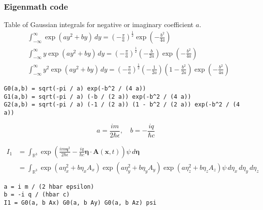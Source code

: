 \subsubsection*{Eigenmath code}

Table of Gaussian integrals for negative or imaginary coefficient $a$.
\begin{align*}
&\int_{-\infty}^\infty\exp(ay^2+by)\,dy
=\left(-\frac{\pi}{a}\right)^\frac{1}{2}
\exp\left(-\frac{b^2}{4a}\right)
\\
&\int_{-\infty}^\infty y\exp(ay^2+by)\,dy
=\left(-\frac{\pi}{a}\right)^\frac{1}{2}
\left(-\frac{b}{2a}\right)
\exp\left(-\frac{b^2}{4a}\right)
\\
&\int_{-\infty}^\infty y^2\exp(ay^2+by)\,dy
=\left(-\frac{\pi}{a}\right)^\frac{1}{2}
\left(-\frac{1}{2a}\right)
\left(1-\frac{b^2}{2a}\right)
\exp\left(-\frac{b^2}{4a}\right)
\end{align*}

{\footnotesize\begin{verbatim}
G0(a,b) = sqrt(-pi / a) exp(-b^2 / (4 a))
G1(a,b) = sqrt(-pi / a) (-b / (2 a)) exp(-b^2 / (4 a))
G2(a,b) = sqrt(-pi / a) (-1 / (2 a)) (1 - b^2 / (2 a)) exp(-b^2 / (4 a))
\end{verbatim}}%

\begin{equation*}
a=\frac{im}{2\hbar\epsilon},\quad
b=-\frac{iq}{\hbar c}
\end{equation*}

\begin{align*}
I_1&=\int_{\mathbb R^3}
\exp\left(\frac{im\boldsymbol\eta^2}{2\hbar\epsilon}
-\frac{iq}{\hbar c}\boldsymbol\eta\cdot\mathbf A(\mathbf x,t)\right)
\psi\,d\boldsymbol\eta
\\
&=\int_{\mathbb R^3}
\exp\left(a\eta_x^2+b\eta_xA_x\right)
\exp\left(a\eta_y^2+b\eta_yA_y\right)
\exp\left(a\eta_z^2+b\eta_zA_z\right)
\psi\,d\eta_x\,d\eta_y\,d\eta_z
\end{align*}

{\footnotesize\begin{verbatim}
a = i m / (2 hbar epsilon)
b = -i q / (hbar c)
I1 = G0(a, b Ax) G0(a, b Ay) G0(a, b Az) psi
\end{verbatim}}%

